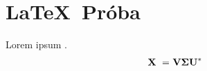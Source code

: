     \section{\LaTeX~Próba}
        Lorem ipsum \cite{PGD}.
        \begin{align}
            {\bf X}~=&~{\bf V\Sigma U}^*
        \end{align}
    
    




